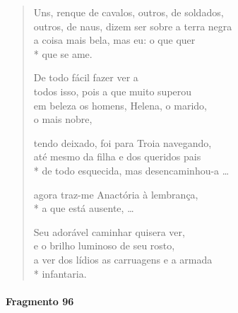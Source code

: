 \begin{verse}
Uns, renque de cavalos, outros, de soldados,\\
outros, de naus, dizem ser sobre a terra negra\\
a coisa mais bela, mas eu: o que quer\\*
que se ame.

De todo fácil fazer ver a\\
todos isso, pois a que muito superou\\			%
em beleza os homens, Helena, o marido, \\
o mais nobre,

tendo deixado, foi para Troia navegando,\\
até mesmo da filha e dos queridos pais\\*
de todo esquecida, mas desencaminhou-a \ldots{}

agora traz-me Anactória à lembrança,\\*
a que está ausente, \ldots{}

Seu adorável caminhar quisera ver,\\
e o brilho luminoso de seu rosto,\\
a ver dos lídios as carruagens e a armada\\*
infantaria.
\end{verse}


\paragraph{Fragmento 96}

